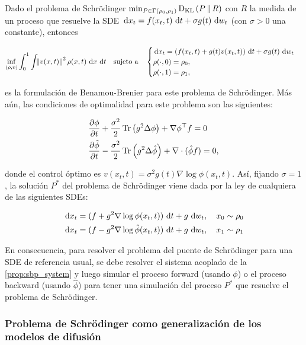 \begin{prop}
	\label{prop:sbp_system}
	Dado el problema de Schrödinger $\min_{P\in\Gamma(\rho_0,\rho_1)} \operatorname{D_{KL}}\left(P\,\|\,R\right)$ con $R$ la medida de un proceso que resuelve la SDE $\,\operatorname{d}\! x_t = f(x_t,t)\,\operatorname{d}\! t + \sigma g(t)\,\operatorname{d}\! w_t$ (con $\sigma>0$ una constante), entonces

	\begin{equation*}
		\inf_{(\rho,v)} \int_0^1 \int_{} \left\lVert v(x,t) \right\rVert^2 \rho(x,t) \,\operatorname{d}\! x\,\operatorname{d}\! t
		\quad \text{sujeto a} \quad
		\begin{cases}
			\,\operatorname{d}\! x_t = \left(f(x_t,t) + g(t)v(x_t,t)\right)\,\operatorname{d}\! t + \sigma g(t)\,\operatorname{d}\! w_t\\
			\rho(\cdot,0) = \rho_0,\\
			\rho(\cdot,1) = \rho_1,
		\end{cases}
	\end{equation*}

	es la formulación de Benamou-Brenier para este problema de Schrödinger. Más aún, las condiciones de optimalidad para este problema son las siguientes:

	\begin{align*}
		&\frac{\partial\phi}{\partial t} + \frac{\sigma^2}{2}\operatorname{Tr}\left(g^2 \Delta\phi\right) + \nabla\phi^\top f = 0\\
		&\frac{\partial\hat\phi}{\partial t} - \frac{\sigma^2}{2}\operatorname{Tr}\left(g^2 \Delta\hat\phi\right) + \nabla\cdot(\hat\phi f)= 0,
	\end{align*}

	donde el control óptimo es $v(x_t,t)=\sigma^2 g(t)\nabla\log\phi(x_t,t)$. Así, fijando $\sigma=1$, la solución $P^*$ del problema de Schrödinger viene dada por la ley de cualquiera de las siguientes SDEs:

	\begin{align*}
		\,\operatorname{d}\! x_t = (f+g^2\nabla\log\phi(x_t,t))\,\operatorname{d}\! t + g\,\operatorname{d}\! w_t,\quad x_0\sim\rho_0\\
		\,\operatorname{d}\! x_t = (f-g^2\nabla\log\hat\phi(x_t,t))\,\operatorname{d}\! t + g\,\operatorname{d}\! w_t,\quad x_1\sim\rho_1
	\end{align*}

\end{prop}

En consecuencia, para resolver el problema del puente de Schrödinger para una SDE de referencia usual, se debe resolver el sistema acoplado de la \autoref{prop:sbp_system} y luego simular el proceso forward (usando $\phi$) o el proceso backward (usando $\hat\phi$) para tener una simulación del proceso $P^*$ que resuelve el problema de Schrödinger.

\subsubsection{Problema de Schrödinger como generalización de los modelos de difusión}

